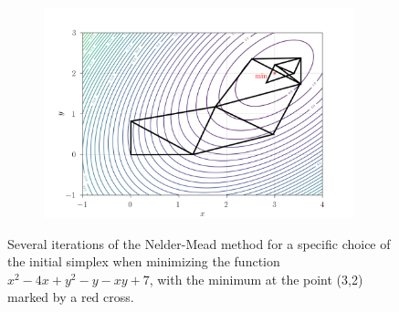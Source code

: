 \begin{figure}[H]
\begin{subfigure}[b]{0.325\textwidth}
	\end{subfigure}
	\begin{center}
		\begin{subfigure}[b]{0.77\textwidth}
			\centering
			\includegraphics[width=0.985\textwidth, trim={0 6mm 0 7mm}]{figures/nelder.png}
		\end{subfigure}
	\end{center}
	
	\caption{Several iterations of the Nelder-Mead method for a specific choice of the initial simplex when minimizing the function $ x^2 - 4x + y^2 - y - xy + 7 $, with the minimum at the point (3,2) marked by a red cross.}
	\label{fig:NM}
\end{figure}

